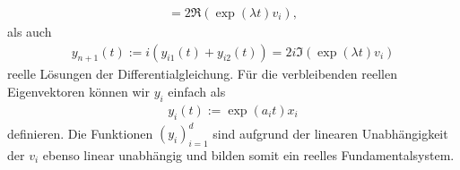 \begin{solution}
\begin{itemize}
\begin{align*}
    = 2\mathfrak{R}(\exp(\lambda t)v_i),
  \end{align*}
  als auch
  \begin{align*}
    y_{n+1}(t) := i(y_{i1}(t) + y_{i2}(t)) = 2i\mathfrak{I}(\exp(\lambda t)v_i)
  \end{align*}
  reelle Lösungen der Differentialgleichung.
  Für die verbleibenden reellen Eigenvektoren können wir $y_i$ einfach als
  \begin{align*}
    y_i(t) := \exp(a_i t)x_i
  \end{align*}
  definieren.
  Die Funktionen $(y_i)_{i=1}^d$ sind aufgrund der linearen Unabhängigkeit der $v_i$
  ebenso linear unabhängig und
  bilden somit ein reelles Fundamentalsystem.
\end{itemize}
\end{solution}
